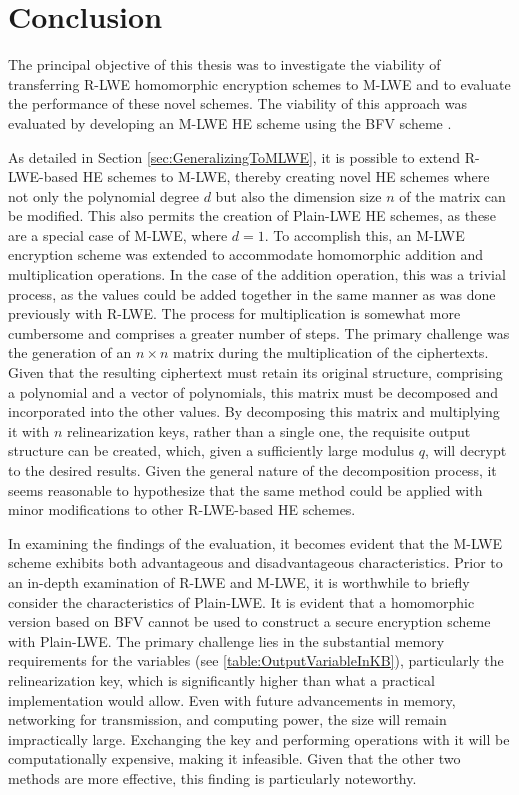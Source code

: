 \chapter{Conclusion}

The principal objective of this thesis was to investigate the viability of transferring R-LWE homomorphic encryption schemes to M-LWE and to evaluate the performance of these novel schemes. The viability of this approach was evaluated by developing an M-LWE HE scheme using the BFV scheme \cite{bfv}.
 
As detailed in Section \ref{sec:GeneralizingToMLWE}, it is possible to extend R-LWE-based HE schemes to M-LWE, thereby creating novel HE schemes where not only the polynomial degree $d$ but also the dimension size $n$ of the matrix can be modified. This also permits the creation of Plain-LWE HE schemes, as these are a special case of M-LWE, where $d=1$. To accomplish this, an M-LWE encryption scheme was extended to accommodate homomorphic  addition and multiplication operations. In the case of the addition operation, this was a trivial process, as the values could be added together in the same manner as was done previously with R-LWE. The process for multiplication is somewhat more cumbersome and comprises a greater number of steps. The primary challenge was the generation of an $n \times n$ matrix during the multiplication of the ciphertexts. Given that the resulting ciphertext must retain its original structure, comprising a polynomial and a vector of polynomials, this matrix must be decomposed and incorporated into the other values. By decomposing this matrix and multiplying it with $n$ relinearization keys, rather than a single one, the requisite output structure can be created, which, given a sufficiently large modulus $q$, will decrypt to the desired results. Given the general nature of the decomposition process, it seems reasonable to hypothesize that the same method could be applied with minor modifications to other R-LWE-based HE schemes.


In examining the findings of the evaluation, it becomes evident that the M-LWE scheme exhibits both advantageous and disadvantageous characteristics. Prior to an in-depth examination of R-LWE and M-LWE, it is worthwhile to briefly consider the characteristics of Plain-LWE. It is evident that a homomorphic version based on BFV cannot be used to construct a secure encryption scheme with Plain-LWE. The primary challenge lies in the substantial memory requirements for the variables (see \ref{table:OutputVariableInKB}), particularly the relinearization key, which is significantly higher than what a practical implementation would allow. Even with future advancements in memory, networking for transmission, and computing power, the size will remain impractically large. Exchanging the key and performing operations with it will be computationally expensive, making it infeasible. Given that the other two methods are more effective, this finding is particularly noteworthy.

